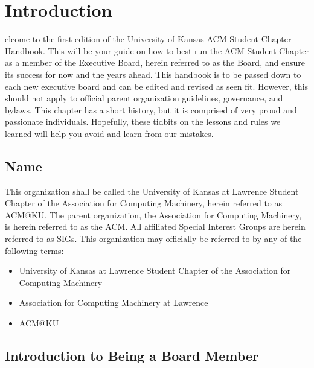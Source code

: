%
%
\let\textcircled=\pgftextcircled
\chapter{Introduction}
\label{chap:intro}

elcome to the first edition of the University of Kansas ACM Student
Chapter Handbook. This will be your guide on how to best run the ACM Student
Chapter as a member of the Executive Board, herein referred to as the Board, and
ensure its success for now and the years ahead. This handbook is to be passed down
to each new executive board and can be edited and revised as seen fit. However,
this should not apply to official parent organization guidelines, governance,
and bylaws. This chapter has a short history, but it is comprised of very proud
and passionate individuals. Hopefully, these tidbits on the lessons and rules we
learned will help you avoid and learn from our mistakes.

\section{Name}
\label{sec:sec01}

This organization shall be called the University of Kansas at Lawrence Student
Chapter of the Association for Computing Machinery, herein referred to as ACM@KU.
The parent organization, the Association for Computing Machinery, is herein
referred to as the ACM. All affiliated Special Interest Groups are herein
referred to as SIGs. This organization may officially be referred to by any of
the following terms:
\begin{itemize}
	\item University of Kansas at Lawrence Student Chapter of the Association for
				Computing Machinery
	\item Association for Computing Machinery at Lawrence
	\item ACM@KU
\end{itemize}

\section{Introduction to Being a Board Member}
\label{sec:sec02}

%

